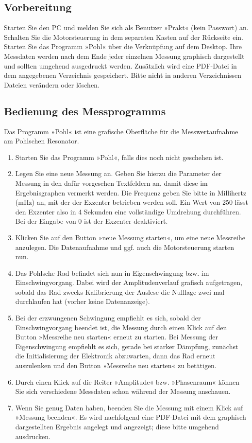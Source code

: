 \subsection{Vorbereitung}

Starten Sie den PC und melden Sie sich als Benutzer »Prakt« (kein Passwort) an. Schalten Sie die Motorsteuerung in dem separaten Kasten auf der Rückseite ein. Starten Sie das Programm »Pohl« über die Verknüpfung auf dem Desktop. Ihre Messdaten werden nach dem Ende jeder einzelnen Messung graphisch dargestellt und sollten umgehend ausgedruckt werden. Zusätzlich wird eine PDF-Datei in dem angegebenen Verzeichnis gespeichert. Bitte nicht in anderen Verzeichnissen Dateien verändern oder löschen.

\subsection{Bedienung des Messprogramms}

Das Programm »Pohl« ist eine grafische Oberfläche für die Messwertaufnahme am Pohlschen Resonator.
\begin{enumerate}
	\item Starten Sie das Programm »Pohl«, falls dies noch nicht geschehen ist.
	\item Legen Sie eine neue Messung an. Geben Sie hierzu die Parameter der Messung in den dafür vorgesehen Textfeldern an, damit diese im Ergebnisgraphen vermerkt werden. Die Frequenz geben Sie bitte in Millihertz (mHz) an, mit der der Exzenter betrieben werden soll. Ein Wert von 250 lässt den Exzenter also in 4 Sekunden eine vollständige Umdrehung durchführen. Bei der Eingabe von 0 ist der Exzenter deaktiviert.
	\item Klicken Sie auf den Button »neue Messung starten«, um eine neue Messreihe anzulegen. Die Datenaufnahme und ggf. auch die Motorsteuerung starten nun.
	\item Das Pohlsche Rad befindet sich nun in Eigenschwingung bzw. im Einschwingvorgang. Dabei wird der Amplitudenverlauf grafisch aufgetragen, sobald das Rad zwecks Kalibrierung der Auslese die Nulllage zwei mal durchlaufen hat (vorher keine Datenanzeige). 
	\item Bei der erzwungenen Schwingung empfiehlt es sich, sobald der Einschwingvorgang beendet ist, die Messung durch einen Klick auf den Button »Messreihe neu starten« erneut zu starten. Bei Messung der Eigenschwingung empfiehlt es sich, gerade bei starker Dämpfung, zunächst die Initialisierung der Elektronik abzuwarten, dann das Rad erneut auszulenken und den Button »Messreihe neu starten« zu betätigen.
	\item Durch einen Klick auf die Reiter »Amplitude« bzw. »Phasenraum« können Sie sich verschiedene Messdaten schon während der Messung anschauen.
	\item Wenn Sie genug Daten haben, beenden Sie die Messung mit einem Klick auf »Messung beenden«. Es wird nachfolgend eine PDF-Datei mit dem graphisch dargestellten Ergebnis angelegt und angezeigt; diese bitte umgehend ausdrucken.
\end{enumerate}

